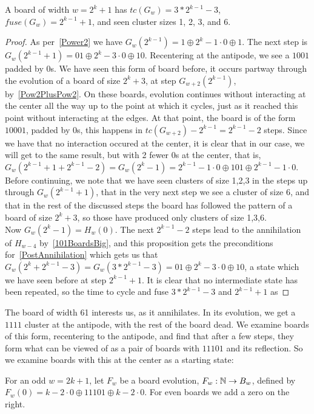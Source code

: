 \documentclass[12pt,letterpaper]{article}
\begin{document}
\begin{prop}
  A board of width $w=2^k+1$ has $tc(G_w)=3*2^{k-1}-3$, $fuse(G_w)=2^{k-1}+1$, and seen cluster sizes 1, 2, 3, and 6.
\end{prop}
\begin{proof}
  As per~\cref{Power2} we have $G_w(2^{k-1}) = 1\oplus 2^k-1\cdot 0\oplus 1$. The next step is $G_w(2^{k-1}+1)=01\oplus 2^k-3\cdot 0\oplus 10$. Recentering at the antipode, we see a $1001$ padded by 0s. We have seen this form of board before, it occurs partway through the evolution of a board of size $2^k+3$, at step $G_{w+2}(2^{k-1})$, by~\cref{Pow2PlusPow2}. On these boards, evolution continues without interacting at the center all the way up to the point at which it cycles, just as it reached this point without interacting at the edges. At that point, the board is of the form $10001$, padded by 0s, this happens in $tc(G_{w+2})-2^{k-1}=2^{k-1}-2$ steps. Since we have that no interaction occured at the center, it is clear that in our case, we will get to the same result, but with 2 fewer 0s at the center, that is, $G_w(2^{k-1}+1+2^{k-1}-2) = G_w(2^k-1)=2^{k-1}-1\cdot 0 \oplus 101\oplus 2^{k-1}-1\cdot 0$. \\
  Before continuing, we note that we have seen clusters of size 1,2,3 in the steps up through $G_w(2^{k-1}+1)$, that in the very next step we see a cluster of size 6, and that in the rest of the discussed steps the board has followed the pattern of a board of size $2^k+3$, so those have produced only clusters of size 1,3,6. \\
  Now $G_w(2^k-1)=H_w(0)$. The next $2^{k-1}-2$ steps lead to the annihilation of $H_{w-4}$ by~\cref{101BoardsBig}, and this proposition gets the preconditions for~\cref{PostAnnihilation} which gets us that $G_w(2^k+2^{k-1}-3)=G_w(3*2^{k-1}-3)=01\oplus 2^k-3\cdot 0\oplus 10$, a state which we have seen before at step $2^{k-1}+1$. It is clear that no intermediate state has been repeated, so the time to cycle and fuse $3*2^{k-1}-3$ and $2^{k-1}+1$ as 
\end{proof}

The board of width 61 interests us, as it annihilates. In its evolution, we get a $1111$ cluster at the antipode, with the rest of the board dead. We examine boards of this form, recentering to the antipode, and find that after a few steps, they form what can be viewed of as a pair of boards with $11101$ and its reflection. So we examine boards with this at the center as a starting state:
\begin{dfn}\label{11101Boards}
  For an odd $w=2k+1$, let $F_w$ be a board evolution, $F_w:\mathbb{N}\rightarrow B_w$, defined by $F_w(0) = k-2\cdot 0 \oplus 11101 \oplus k-2\cdot 0$. For even boards we add a zero on the right.
\end{dfn}
\end{document}
